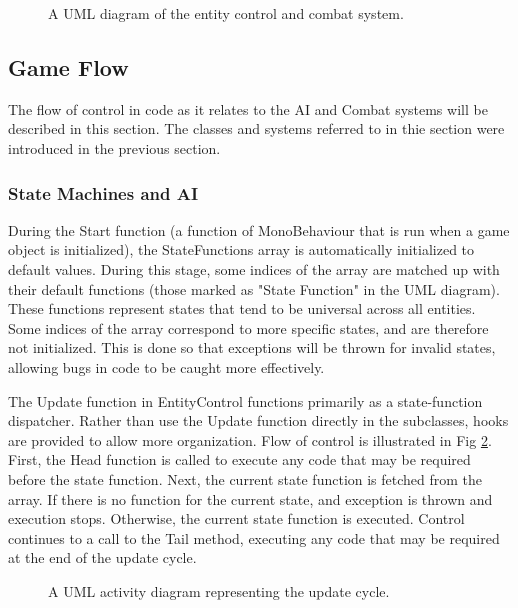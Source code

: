\documentclass{article}
\begin{document}
\begin{figure}[h!]

{

}
\caption{A UML diagram of the entity control and combat system.}
\label{AI_Combat}
\end{figure}








\subsection{Game Flow}

The flow of control in code as it relates to the AI and Combat systems will be described in this section.  The classes and systems referred to in thie section were introduced in the previous section.

\subsubsection{State Machines and AI}

During the Start function (a function of MonoBehaviour that is run when a game object is initialized), the StateFunctions array is automatically initialized to default values.  During this stage, some indices of the array are matched up with their default functions (those marked as "State Function" in the UML diagram).  These functions represent states that tend to be universal across all entities.  Some indices of the array correspond to more specific states, and are therefore not initialized.  This is done so that exceptions will be thrown for invalid states, allowing bugs in code to be caught more effectively.

The Update function in EntityControl functions primarily as a state-function dispatcher.  Rather than use the Update function directly in the subclasses, hooks are provided to allow more organization.  Flow of control is illustrated in Fig \ref{UpdateCycle}.  First, the Head function is called to execute any code that may be required before the state function.  Next, the current state function is fetched from the array.  If there is no function for the current state, and exception is thrown and execution stops.  Otherwise, the current state function is executed.  Control continues to a call to the Tail method, executing any code that may be required at the end of the update cycle.

\begin{figure}[h!]
{

}
\caption{A UML activity diagram representing the update cycle.}
\label{UpdateCycle}
\end{figure}
\end{document}
